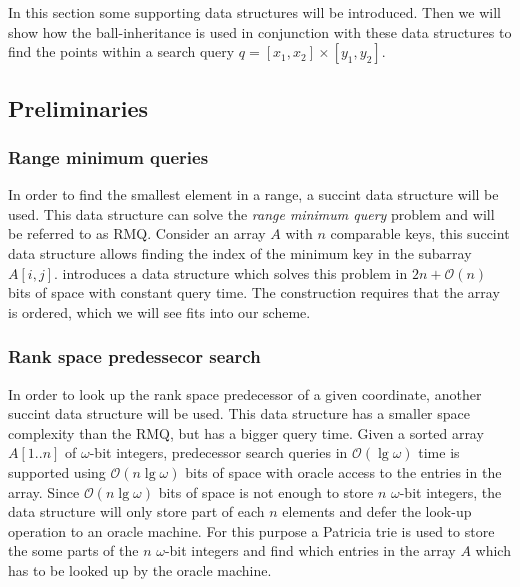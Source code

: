 In this section some supporting data structures will be introduced. Then we will show how the ball-inheritance is used in conjunction with these data structures to find the points within a search query $q = [x_1, x_2] \times [y_1, y_2]$.

\subsection{Preliminaries}

\subsubsection{Range minimum queries}
In order to find the smallest element in a range, a succint data structure will be used. This data structure can solve the \emph{range minimum query} problem and will be referred to as RMQ. 
Consider an array $A$ with $n$ comparable keys, this succint data structure allows finding the index of the minimum key in the subarray $A[i,j]$. \citet{fischer} introduces a data structure which solves this problem in $2n + \mathcal{O}(n)$ bits of space with constant query time. The construction requires that the array is ordered, which we will see fits into our scheme.

\subsubsection{Rank space predessecor search}
In order to look up the rank space predecessor of a given coordinate, another succint data structure will be used. This data structure has a smaller space complexity than the RMQ, but has a bigger query time.
Given a sorted array $A[1..n]$ of $\omega$-bit integers, predecessor search queries in $\mathcal{O}(\lg \omega)$ time is supported using $\mathcal{O}(n \lg \omega)$ bits of space with oracle access to the entries in the array. Since $\mathcal{O}(n \lg \omega)$ bits of space is not enough to store $n$ $\omega$-bit integers, the data structure will only store part of each $n$ elements and defer the look-up operation to an oracle machine. For this purpose a Patricia trie \cite{morehaste} is used to store the some parts of the $n$ $\omega$-bit integers and find which entries in the array $A$ which has to be looked up by the oracle machine.

